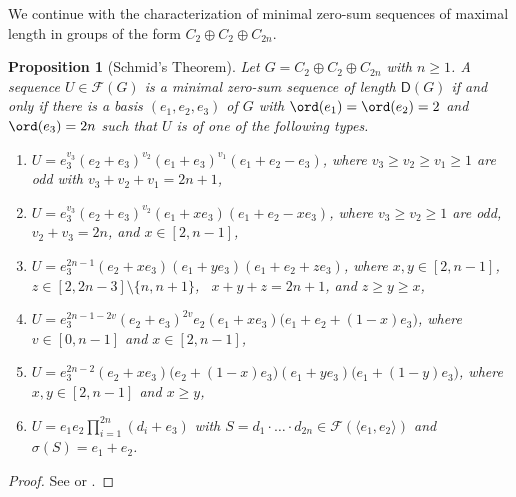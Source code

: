 \documentclass[a4paper, 10pt]{amsart}
\theoremstyle{plain}
\newtheorem{proposition}[theorem]{\bf Proposition}
\theoremstyle{definition}
\numberwithin{equation}{section}
\begin{document}
We continue with the characterization of minimal zero-sum sequences of maximal length in groups of the form $C_2 \oplus C_2 \oplus C_{2n}$.


\begin{proposition}[Schmid's Theorem] \label{4.2}
Let $G = C_2 \oplus C_2 \oplus C_{2n}$ with $n\geq 1$. A sequence $U \in \mathcal F (G)$ is a minimal zero-sum sequence of length $\mathsf D (G)$ if and only if there is a basis $(e_1, e_2, e_3)$ of $G$ with $\ord (e_1)=\ord (e_2)=2$ and $\ord (e_3) = 2n$ such  that $U$ is of one of the following types.
\begin{enumerate}
\item[(a)] $U = e_3^{v_3} (e_2+e_3)^{v_2} (e_1+e_3)^{v_1} (e_1+e_2-e_3)$, where  $v_3 \ge v_2 \ge v_1\geq 1$ are odd with  $v_3+v_2+v_1=2n+1$,

\item[(b)] $U = e_3^{v_3} (e_2+e_3)^{v_2} (e_1+xe_3) (e_1+e_2-xe_3)$, where  $v_3 \ge v_2\geq 1$ are odd,  $v_2+v_3=2n$, and $x \in [2, n-1]$,

\item[(c)] $U = e_3^{2n-1} (e_2+xe_3) (e_1+ye_3) (e_1+e_2+ze_3)$, where  $x, y \in [2, n-1]$, \ $z \in [2, 2n-3] \setminus \{n,n+1\}$, \  $x+y+z=2n+1$, and $ z\geq y\geq x$,

\item[(d)] $U=e_3^{2n-1-2v} (e_2+e_3)^{2v} e_2 (e_1+xe_3) \big(e_1+e_2+(1-x)e_3\big)$, where  $v \in [0, n-1]$ and $x \in [2, n-1]$,

\item[(e)] $U = e_3^{2n-2} (e_2+x e_3) \big( e_2+(1-x)e_3\big)  (e_1+ye_3)  \big( e_1+(1-y)e_3 \big)$, where  $x, y \in [2, n-1]$ and $x \ge y$,

\item[(f)] $U = e_1  e_2  \prod_{i=1}^{2n}(d_i+e_3)$ with $S=d_1  \cdot\ldots\cdot  d_{2n} \in \mathcal F (\langle e_1, e_2 \rangle)$ and $\sigma (S) = e_1+e_2$.
\end{enumerate}
\end{proposition}

\begin{proof}
See \cite[Theorem 3.13]{Sc11b} or \cite[Theorem 4.6.1]{Ge-Gr-Zh26a}.
\end{proof}
\end{document}
